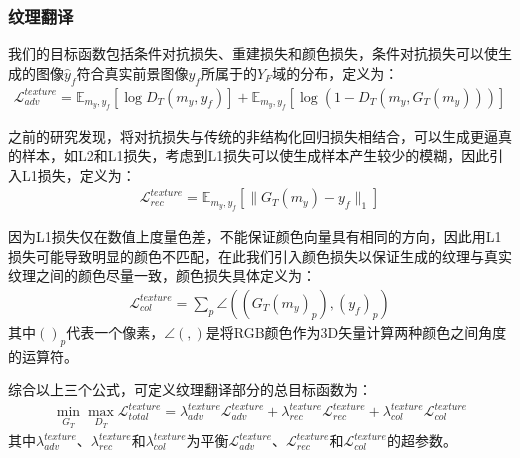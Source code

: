 \subsubsection{纹理翻译}

我们的目标函数包括条件对抗损失、重建损失和颜色损失，条件对抗损失可以使生成的图像$\hat{y}_f$符合真实前景图像$y_f$所属于的$Y_F$域的分布，定义为：
\begin{equation}
\begin{split}
\mathcal{L}_{adv}^{texture}=\mathbb{E}_{m_y,y_f}[\log D_T(m_y,y_f)]+\mathbb{E}_{m_y,y_f}[\log(1-D_T(m_y,G_T(m_y)))]
\end{split}
\label{eq:texture_adv}
\end{equation}

之前的研究发现，将对抗损失与传统的非结构化回归损失相结合，可以生成更逼真的样本，如L2\cite{pathak2016context}和L1损失\cite{isola2017image}\cite{shrivastava2017learning}，考虑到L1损失可以使生成样本产生较少的模糊，因此引入L1损失，定义为：
\begin{equation}
\begin{split}
\mathcal{L}_{rec}^{texture}=\mathbb{E}_{m_y,y_f}[\parallel G_T(m_y)-y_f\parallel_1]
\end{split}
\label{eq:texture_rec}
\end{equation}

因为L1损失仅在数值上度量色差，不能保证颜色向量具有相同的方向，因此用L1损失可能导致明显的颜色不匹配，在此我们引入颜色损失\cite{wang2019underexposed}以保证生成的纹理与真实纹理之间的颜色尽量一致，颜色损失具体定义为：
\begin{equation}
\begin{split}
\mathcal{L}_{col}^{texture}=\sum_{p}\angle((G_T(m_y)_p),(y_f)_p)
\end{split}
\label{eq:texture_col}
\end{equation}
其中$()_p$代表一个像素，$\angle(,)$是将RGB颜色作为3D矢量计算两种颜色之间角度的运算符。

综合以上三个公式，可定义纹理翻译部分的总目标函数为：
\begin{equation}
\begin{split}
\min \limits_{G_T} \max \limits_{D_T} \mathcal{L}_{total}^{texture}=\lambda_{adv}^{texture}\mathcal{L}_{adv}^{texture}+\lambda_{rec}^{texture}\mathcal{L}_{rec}^{texture}+\lambda_{col}^{texture}\mathcal{L}_{col}^{texture}
\end{split}
\label{eq:texture}
\end{equation}
其中$\lambda_{adv}^{texture}$、$\lambda_{rec}^{texture}$和$\lambda_{col}^{texture}$为平衡$\mathcal{L}_{adv}^{texture}$、$\mathcal{L}_{rec}^{texture}$和$\mathcal{L}_{col}^{texture}$的超参数。

